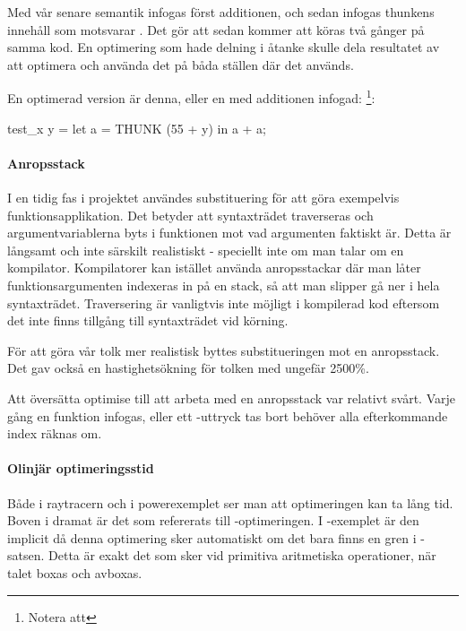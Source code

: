 \documentclass[Rapport]{subfiles}
\begin{document}
Med vår senare semantik infogas först additionen, och sedan infogas thunkens innehåll
som motsvarar . Det gör att  sedan kommer att
köras två gånger på samma kod. En optimering som hade delning i åtanke 
skulle dela resultatet av att optimera  och använda det på båda ställen där det används.

En optimerad version är denna, eller en med additionen infogad:
\footnote{Notera att }:

\begin{codeEx}
test_x y = let
    { a = THUNK (55 + y)
    } in a + a;
\end{codeEx}

\paragraph{Anropsstack}

I en tidig fas i projektet användes substituering för att göra exempelvis funktionsapplikation.
Det betyder att syntaxträdet traverseras och argumentvariablerna byts i funktionen
mot vad argumenten faktiskt är. Detta är långsamt och inte särskilt realistiskt - 
speciellt inte om man talar om en kompilator. Kompilatorer kan istället använda anropsstackar
där man låter funktionsargumenten indexeras in på en stack, så att man slipper
gå ner i hela syntaxträdet. Traversering är vanligtvis inte möjligt i kompilerad kod eftersom
det inte finns tillgång till syntaxträdet vid körning.

För att göra vår tolk mer realistisk byttes substitueringen mot en anropsstack. 
Det gav också en hastighetsökning för tolken med ungefär 2500\%.


Att översätta optimise till att arbeta med en anropsstack var relativt svårt. 
Varje gång en funktion infogas, eller ett -uttryck tas bort behöver alla efterkommande index räknas om. 

\paragraph{Olinjär optimeringsstid}
\label{sec:diskussion_om_exponentialitet} %
Både i raytracern och i powerexemplet ser man att optimeringen kan ta lång tid.
Boven i dramat är det som refererats till -optimeringen. I
-exemplet är den implicit då denna optimering sker automatiskt
om det bara finns en gren i -satsen. Detta är exakt det som sker 
vid primitiva aritmetiska operationer, när talet boxas och avboxas.
\end{document}

